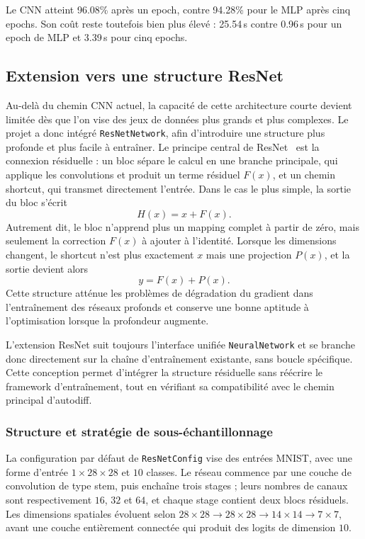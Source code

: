 \documentclass[a4paper,11pt,oneside]{article}
\begin{document}
Le CNN atteint 96.08\% après un epoch, contre 94.28\% pour le MLP après cinq epochs. Son coût reste toutefois bien plus élevé : 25.54\,s contre 0.96\,s pour un epoch de MLP et 3.39\,s pour cinq epochs.

\subsection{Extension vers une structure ResNet}

Au-delà du chemin CNN actuel, la capacité de cette architecture courte devient limitée dès que l'on vise des jeux de données plus grands et plus complexes. Le projet a donc intégré \texttt{ResNetNetwork}, afin d'introduire une structure plus profonde et plus facile à entraîner. Le principe central de ResNet~\cite{he2016resnet} est la connexion résiduelle : un bloc sépare le calcul en une branche principale, qui applique les convolutions et produit un terme résiduel $F(x)$, et un chemin shortcut, qui transmet directement l'entrée. Dans le cas le plus simple, la sortie du bloc s'écrit
\[
H(x) = x + F(x).
\]
Autrement dit, le bloc n'apprend plus un mapping complet à partir de zéro, mais seulement la correction $F(x)$ à ajouter à l'identité. Lorsque les dimensions changent, le shortcut n'est plus exactement $x$ mais une projection $P(x)$, et la sortie devient alors
\[
y = F(x) + P(x).
\]
Cette structure atténue les problèmes de dégradation du gradient dans l'entraînement des réseaux profonds et conserve une bonne aptitude à l'optimisation lorsque la profondeur augmente.

L'extension ResNet suit toujours l'interface unifiée \texttt{NeuralNetwork} et se branche donc directement sur la chaîne d'entraînement existante, sans boucle spécifique. Cette conception permet d'intégrer la structure résiduelle sans réécrire le framework d'entraînement, tout en vérifiant sa compatibilité avec le chemin principal d'autodiff.

\subsubsection{Structure et stratégie de sous-échantillonnage}

La configuration par défaut de \texttt{ResNetConfig} vise des entrées MNIST, avec une forme d'entrée $1\times28\times28$ et $10$ classes. Le réseau commence par une couche de convolution de type stem, puis enchaîne trois stages ; leurs nombres de canaux sont respectivement $16$, $32$ et $64$, et chaque stage contient deux blocs résiduels. Les dimensions spatiales évoluent selon $28\times28 \rightarrow 28\times28 \rightarrow 14\times14 \rightarrow 7\times7$, avant une couche entièrement connectée qui produit des logits de dimension $10$.
\end{document}
